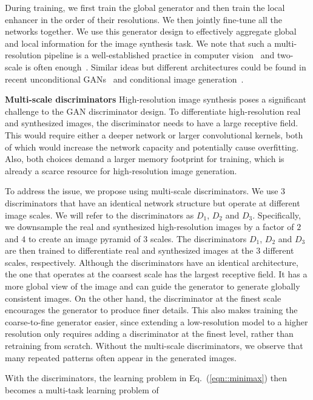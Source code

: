 During training, we first train the global generator and then train the local enhancer in the order of their resolutions. We then jointly fine-tune all the networks together. We use this generator design to effectively aggregate global and local information for the image synthesis task. We note that such a multi-resolution pipeline is a well-established practice in computer vision~\cite{burt1983laplacian} and two-scale is often enough~\cite{brown2003recognising}. Similar ideas but different architectures could be found in recent unconditional GANs~\cite{denton2015deep,huang2017sgan} and conditional image generation~\cite{chen2017photographic,zhang2016stackgan}.

 {\bf Multi-scale discriminators } High-resolution image synthesis poses a significant challenge to the GAN discriminator design. To differentiate high-resolution real and synthesized images, the discriminator needs to have a large receptive field. This would require either a deeper network or larger convolutional kernels, both of which would increase the network capacity and potentially cause overfitting. Also, both choices demand a larger memory footprint for training, which is already a scarce resource for high-resolution image generation.

To address the issue, we propose using multi-scale discriminators. We use $3$ discriminators that have an identical network structure but operate at different image scales. We will refer to the discriminators as $D_1$, $D_2$ and $D_3$. Specifically, we downsample the real and synthesized high-resolution images by a factor of $2$ and $4$ to create an image pyramid of 3 scales. The discriminators $D_1$, $D_2$ and $D_3$ are then trained to differentiate real and synthesized images at the $3$ different scales, respectively. Although the discriminators have an identical architecture, the one that operates at the coarsest scale has the largest receptive field. It has a more global view of the image and can guide the generator to generate globally consistent images. On the other hand, the discriminator at the finest scale encourages the generator to produce finer details. This also makes training the coarse-to-fine generator easier, since extending a low-resolution model to a higher resolution only requires adding a discriminator at the finest level, rather than retraining from scratch. Without the multi-scale discriminators, we observe that many repeated patterns often appear in the generated images.

With the discriminators, the learning problem in Eq.~(\ref{eqn::minimax}) then becomes a multi-task learning problem of

